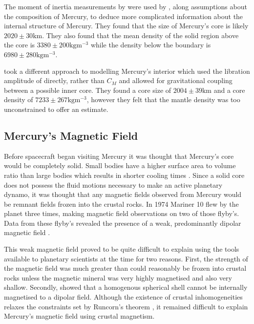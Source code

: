 The moment of inertia measurements by \citet{margot2012} were used by \citet{hauck2013}, along assumptions about the composition of Mercury, to deduce more complicated information about the internal structure of Mercury. They found that the size of Mercury's core is likely $2020 \pm 30\textrm{km}$. They also found that the mean density of the solid region above the core is $3380\pm200 \textrm{kg} \textrm{m}^{-3}$ while the density below the boundary is $6980\pm280 \textrm{kg} \textrm{m}^{-3}$.

\citet{rivoldini2013} took a different approach to modelling Mercury's interior which used the libration amplitude of \citet{margot2012} directly, rather than $C_M$ and allowed for gravitational coupling between a possible inner core. They found a core size of $2004 \pm 39 \textrm{km}$ and a core density of  $7233\pm267 \textrm{kg} \textrm{m}^{-3}$, however they felt that the mantle density was too unconstrained to offer an estimate.

\subsection{Mercury's Magnetic Field} 
Before spacecraft began visiting Mercury it was thought that Mercury's core would be completely solid. Small bodies have a higher surface area to volume ratio than large bodies which results in shorter cooling times \citep{siegfried1974} . Since a solid core does not possess the fluid motions necessary to make an active planetary dynamo, it was thought that any magnetic fields observed from Mercury would be remnant fields frozen into the crustal rocks. In 1974 Mariner 10 flew by the planet three times, making magnetic field observations on two of those flyby's. Data from these flyby's revealed the presence of a weak, predominantly dipolar magnetic field \citep{nessmariner10}.

This weak magnetic field proved to be quite difficult to explain using the tools available to planetary scientists at the time for two reasons. First, the strength of the magnetic field was much greater than could reasonably be frozen into crustal rocks unless the magnetic mineral was very highly magnetised and also very shallow. Secondly, \citet{runcorn1976} showed that a homogenous spherical shell cannot be internally magnetised to a dipolar field. Although the existence of crustal inhomogeneities relaxes the constraints set by Runcorn's theorem  \citep{Aharonson2004}, it remained difficult to explain Mercury's magnetic field using crustal magnetism.


